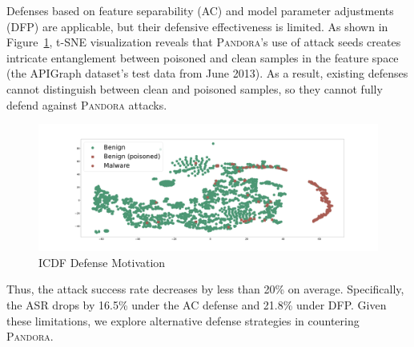 \documentclass[lettersize,journal]{IEEEtran}
\newcommand{\pandora}{{\scshape Pandora}\xspace}
\begin{document}
Defenses based on feature separability (AC) and model parameter adjustments (DFP) are applicable, but their defensive effectiveness is limited.
As shown in Figure~\ref{fig:ICDF Defense Motivation}, t-SNE
visualization reveals that \pandora's use of attack seeds creates intricate entanglement between poisoned and clean samples in the
feature space (the APIGraph dataset's test data from June 2013).
As a result, existing defenses cannot distinguish between clean and poisoned samples, so they cannot fully defend against \pandora attacks.
\begin{figure}[h!]
	\centering
	\includegraphics[width=\linewidth,keepaspectratio]{Graph/Evaluation/Figure20.pdf}
	\caption{ICDF Defense Motivation}
	\label{fig:ICDF Defense Motivation}
\end{figure}
Thus, the attack success rate decreases by less than 20\% on average. Specifically, the ASR drops by 16.5\% under the AC defense and 21.8\% under DFP.
Given these limitations, we explore alternative defense strategies in countering \pandora.
\end{document}
